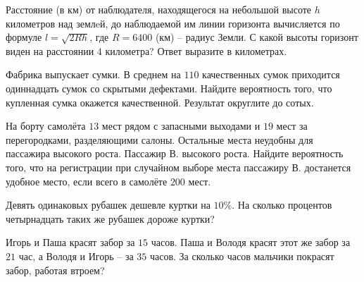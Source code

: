\begin{class}[number=1]
\begin{listofex}
		\item Расстояние (в км) от наблюдателя, находящегося на небольшой высоте \( h \) километров над землeй, до наблюдаемой им линии горизонта вычисляется по формуле \( l=\sqrt{2Rh} \), где \( R = 6400 \) (км) – радиус Земли. С какой высоты горизонт виден на расстоянии \(4\) километра? Ответ выразите в километрах.
		\item Фабрика выпускает сумки. В среднем на \( 110 \) качественных сумок приходится одиннадцать сумок со скрытыми дефектами. Найдите вероятность того, что купленная сумка окажется качественной. Результат округлите до сотых.
		\item На борту самолёта \( 13 \) мест рядом с запасными выходами и \( 19 \) мест за перегородками, разделяющими салоны. Остальные места неудобны для пассажира высокого роста. Пассажир В. высокого роста. Найдите вероятность того, что на регистрации при случайном выборе места пассажиру В. достанется удобное место, если всего в самолёте \( 200 \) мест.
		\item Девять одинаковых рубашек дешевле куртки на \( 10\% \). На сколько процентов четырнадцать таких же рубашек дороже куртки?
		\item Игорь и Паша красят забор за \( 15 \) часов. Паша и Володя красят этот же забор за \( 21 \) час, а Володя и Игорь – за \( 35 \) часов. За сколько часов мальчики покрасят забор, работая втроем?
	\end{listofex}
\end{class}
%
%
%
%
